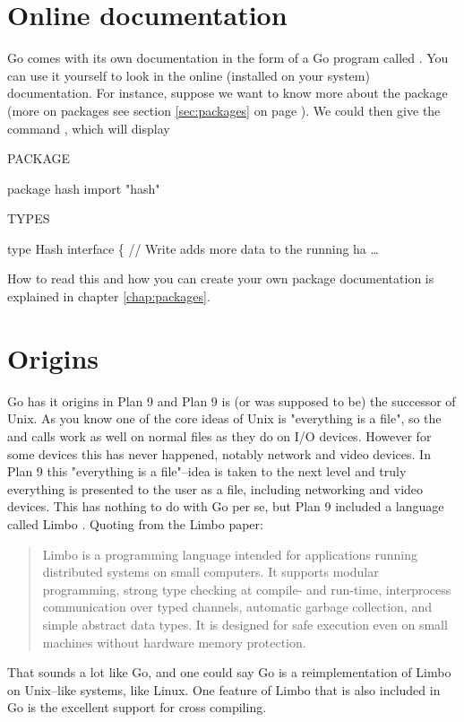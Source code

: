 \section{Online documentation}
Go comes with its own documentation in the form of a Go program called
. 
You can use it yourself to look
in the online (installed on your system) documentation. For
instance, suppose we want to know more about the package  
(more on packages see section \ref{sec:packages} on page
\pageref{sec:packages}). We could then give the command
, which will display
\begin{display}
PACKAGE

package hash
import "hash"

TYPES

type Hash interface \{
    // Write adds more data to the running ha \ldots
\end{display}
How to read this and how you can create your own package documentation
is explained in chapter \ref{chap:packages}.

\section{Origins}
Go has it origins in Plan 9 \cite{plan9} and Plan 9 is (or was 
supposed to be) the successor of Unix. As you know one of the
core ideas of Unix is "everything is a file", so the  and
 calls work as well on normal files as they do on I/O
devices. However for some devices this has never happened, notably
network and video devices. In Plan 9 this "everything is a file"--idea
is taken to the next level and truly everything is presented to the 
user as a file, including networking and video devices. This has nothing
to do with Go per se, but Plan 9 included a language called Limbo
\cite{limbo}. Quoting from the Limbo paper:
\begin{quote}
Limbo is a programming language intended for applications running
distributed systems on small computers. It supports modular programming,
strong type checking at compile- and run-time, interprocess
communication over typed channels, automatic garbage collection, and
simple abstract data types. It is designed for safe execution even on
small machines without hardware memory protection.
\end{quote}
That sounds a lot like Go, and one could say Go is a reimplementation of
Limbo on Unix--like systems, like Linux. One feature of Limbo that is
also included in Go is the excellent support for cross compiling.

